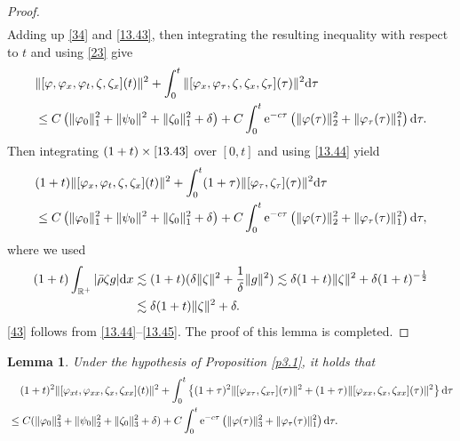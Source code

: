 \documentclass[11pt]{article}
\theoremstyle{plain}
\newtheorem{lemma}{Lemma}[section]
\numberwithin{equation}{section}
\begin{document}
\begin{proof}
\begin{align}
		\end{align}
Adding up \eqref{34} and \eqref{13.43}, then integrating the resulting inequality with respect to $t$ and using \eqref{23} give
		\begin{align}\label{13.44}
			& \|[\varphi,\varphi_x,\varphi_t,\zeta,\zeta_x](t)\|^2+\int_{0}^{t}\|[\varphi_x,\varphi_\tau,\zeta,\zeta_x,\zeta_{\tau}](\tau)\|^2{\rm d}\tau \notag\\
			&	\leq C\left(\|\varphi_0\|_1^2+\|\psi_0\|^2+\|\zeta_0\|_1^2+\delta\right)+C\int_{0}^{t}{\rm e}^{-c\tau}\left(\|\varphi(\tau)\|_2^2+\|\varphi_{\tau}(\tau)\|_1^2\right){\rm d}\tau.
		\end{align}
Then integrating $(1 + t) \times \eqref{13.43} $ over $[0, t]$ and using \eqref{13.44} yield
		\begin{align}\label{13.45}
			&(1+t)\|[\varphi_x,\varphi_t,\zeta,\zeta_x](t)\|^2+\int_{0}^{t}(1+\tau)\|[\varphi_{\tau},\zeta_{\tau}](\tau)\|^2{\rm d}\tau\notag\\ 
			&\leq C\left(\|\varphi_0\|_1^2+\|\psi_0\|^2+\|\zeta_0\|_1^2+\delta\right)+C\int_{0}^{t}{\rm e}^{-c\tau}\left(\|\varphi(\tau)\|_2^2+\|\varphi_{\tau}(\tau)\|_1^2\right){\rm d}\tau,
		\end{align}
		where we used 
\begin{align}\notag
	(1+t)\int_{\mathbb{R}^+}|\bar\rho\zeta g|{\rm d}x&\lesssim(1+t)(\delta\|\zeta\|^2+\frac{1}{\delta}\|g\|^2)\lesssim\delta(1+t)\|\zeta\|^2+\delta(1+t)^{-\frac{1}{2}}\notag\\ 
	&\lesssim\delta(1+t)\|\zeta\|^2+\delta.\notag
\end{align}
\eqref{43} follows from \eqref{13.44}--\eqref{13.45}. The proof of this lemma is completed.
		\end{proof}
	\begin{lemma}\label{l3.4}
		Under the hypothesis of Proposition \ref{p3.1}, it holds that
		\begin{align}\label{13.46}
			&\;\;\;\;(1+t)^2\|[\varphi_{xt},\varphi_{xx},\zeta_x,\zeta_{xx}](t)\|^2+\int_{0}^{t}\left\{(1+\tau)^2\|[\varphi_{x\tau},\zeta_{x\tau}](\tau)\|^2+(1+\tau)\|[\varphi_{xx},\zeta_x,\zeta_{xx}](\tau)\|^2\right\}{\rm d}\tau\notag\\
			&\leq C(\|\varphi_0\|_3^2+\|\psi_0\|_2^2+\|\zeta_0\|_3^2+\delta)+C\int_{0}^{t}{\rm e}^{-c\tau}\left(\|\varphi(\tau)\|_3^2+\|\varphi_{\tau}(\tau)\|_1^2\right){\rm d}\tau.
		\end{align}
	\end{lemma}
\end{document}
